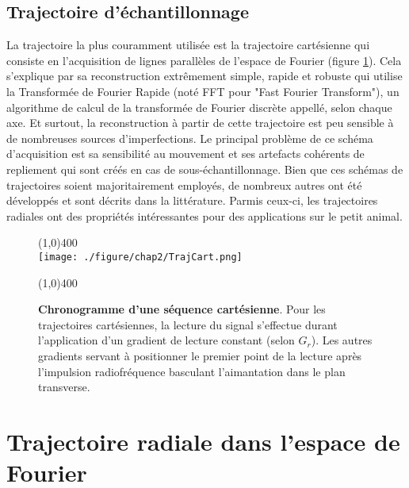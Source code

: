 \subsection{Trajectoire d'échantillonnage}

La trajectoire la plus couramment utilisée est la trajectoire cartésienne qui consiste en l'acquisition de lignes parallèles de l'espace de Fourier (figure \ref{fig:TrajCart}). Cela s'explique par sa reconstruction extrêmement simple, rapide et robuste qui utilise la Transformée de Fourier Rapide (noté FFT pour "Fast Fourier Transform"), un algorithme de calcul de la transformée de Fourier discrète appellé, selon chaque axe. Et surtout, la reconstruction à partir de cette trajectoire est peu sensible à de nombreuses sources d'imperfections. Le principal problème de ce schéma d'acquisition est sa sensibilité au mouvement et ses artefacts cohérents de repliement qui sont créés en cas de sous-échantillonnage.
Bien que ces schémas de trajectoires soient majoritairement employés, de nombreux autres ont été développés et sont décrits dans la littérature. Parmis ceux-ci, les trajectoires radiales ont des propriétés intéressantes pour des applications sur le petit animal.

\begin{figure}[h]
\centering
\line(1,0){400} \\
\texttt{[image: ./figure/chap2/TrajCart.png]}
\caption[Chronogramme d'une séquence cartésienne]{\label{fig:TrajCart} \textbf{Chronogramme d'une séquence cartésienne}. Pour les trajectoires cartésiennes, la lecture du signal s'effectue durant l'application d'un gradient de lecture constant (selon $G_r$). Les autres gradients servant à positionner le premier point de la lecture après l'impulsion radiofréquence basculant l'aimantation dans le plan transverse.}
\line(1,0){400} \\
\end{figure}

\section{Trajectoire radiale dans l'espace de Fourier}

